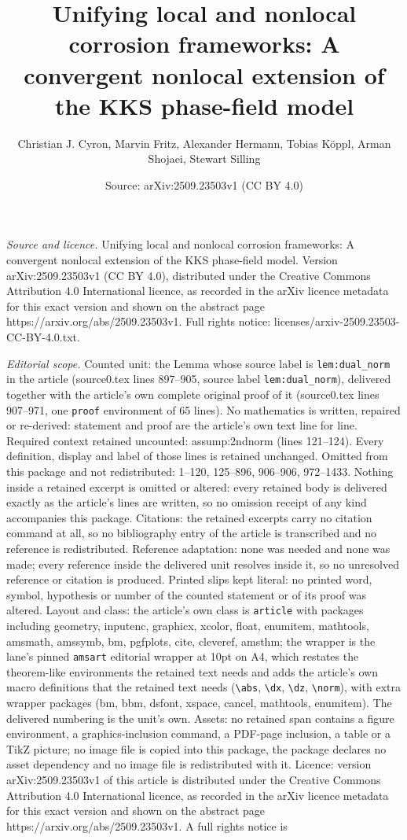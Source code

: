 \documentclass[10pt,a4paper]{amsart}
\title[Unifying local and nonlocal corrosion frameworks: A converge]{Unifying local and nonlocal corrosion frameworks: A convergent nonlocal extension of the KKS phase-field model}
\author{Christian J. Cyron, Marvin Fritz, Alexander Hermann, Tobias K\"oppl, Arman Shojaei, Stewart Silling}
\date{Source: arXiv:2509.23503v1 (CC BY 4.0)}
\begin{document}
\maketitle

\noindent\emph{Source and licence.} Unifying local and nonlocal corrosion frameworks: A convergent nonlocal extension of the KKS phase-field model. Version arXiv:2509.23503v1 (CC BY 4.0), distributed under the Creative Commons Attribution 4.0 International licence, as recorded in the arXiv licence metadata for this exact version and shown on the abstract page https://arxiv.org/abs/2509.23503v1. Full rights notice: licenses/arxiv-2509.23503-CC-BY-4.0.txt.\par\smallskip

\noindent\textit{Editorial scope.} Counted unit: the Lemma whose source label is \texttt{lem:dual\_norm} in the article (source0.tex lines 897--905, source label \texttt{lem:dual\_norm}), delivered together with the article's own complete original proof of it (source0.tex lines 907--971, one \texttt{proof} environment of 65 lines). No mathematics is written, repaired or re-derived: statement and proof are the article's own text line for line. Required context retained uncounted: assump:2ndnorm (lines 121--124). Every definition, display and label of those lines is retained unchanged. Omitted from this package and not redistributed: 1--120, 125--896, 906--906, 972--1433. Nothing inside a retained excerpt is omitted or altered: every retained body is delivered exactly as the article's lines are written, so no omission receipt of any kind accompanies this package. Citations: the retained excerpts carry no citation command at all, so no bibliography entry of the article is transcribed and no reference is redistributed. Reference adaptation: none was needed and none was made; every reference inside the delivered unit resolves inside it, so no unresolved reference or citation is produced. Printed slips kept literal: no printed word, symbol, hypothesis or number of the counted statement or of its proof was altered. Layout and class: the article's own class is \texttt{article} with packages including geometry, inputenc, graphicx, xcolor, float, enumitem, mathtools, amsmath, amssymb, bm, pgfplots, cite, cleveref, amsthm; the wrapper is the lane's pinned \texttt{amsart} editorial wrapper at 10pt on A4, which restates the theorem-like environments the retained text needs and adds the article's own macro definitions that the retained text needs (\texttt{\textbackslash abs}, \texttt{\textbackslash dx}, \texttt{\textbackslash dz}, \texttt{\textbackslash norm}), with extra wrapper packages (bm, bbm, dsfont, xspace, cancel, mathtools, enumitem). The delivered numbering is the unit's own. Assets: no retained span contains a figure environment, a graphics-inclusion command, a PDF-page inclusion, a table or a TikZ picture; no image file is copied into this package, the package declares no asset dependency and no image file is redistributed with it. Licence: version arXiv:2509.23503v1 of this article is distributed under the Creative Commons Attribution 4.0 International licence, as recorded in the arXiv licence metadata for this exact version and shown on the abstract page https://arxiv.org/abs/2509.23503v1. A full rights notice is 
\end{document}
